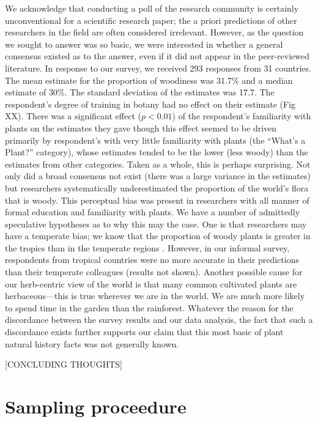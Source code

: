 \documentclass[12pt]{article}
\begin{document}
We acknowledge that conducting a poll of the research community is certainly unconventional for a scientific research paper; the a priori predictions of other researchers in the field are often considered irrelevant. However, as the question we sought to answer was so basic, we were interested in whether a general consensus existed as to the answer, even if it did not appear in the peer-reviewed literature. In response to our survey, we received 293 responses from 31 countries. The mean estimate for the proportion of woodiness was 31.7\% and a median estimate of 30\%. The standard deviation of the estimates was 17.7. The respondent's degree of training in botany had no effect on their estimate (Fig XX). There was a significant effect ($p<0.01$) of the respondent's  familiarity with plants on the estimates they gave though this effect seemed to be driven primarily by respondent's with very little familiarity with plants (the ``What's a Plant?'' category), whose estimates tended to be the lower (less woody) than the estimates from other categories. Taken as a whole, this is perhaps surprising. Not only did a broad consensus not exist (there was a large variance in the estimates) but researchers systematically underestimated the proportion of the world's flora that is woody. This perceptual bias was present in researchers with all manner of formal education and familiarity with plants. We have a number of admittedly speculative hypotheses as to why this may the case. One is that researchers may have a temperate bias; we know that the proportion of woody plants is greater in the tropics than in the temperate regions \citep{Molesheihgt}. However, in our informal survey, respondents from tropical countries were no more accurate in their predictions than their temperate colleagues (results not shown). Another possible cause for our herb-centric view of the world is that many common cultivated plants are herbaceous---this is true wherever we are in the world. We are much more likely to spend time in the garden than the rainforest. Whatever the reason for the discordance between the survey results and our data analysis, the fact that such a discordance exists further supports our claim that this most basic of plant natural history facts was not generally known.   

[CONCLUDING THOUGHTS]

\clearpage
\setcounter{secnumdepth}{1}
\appendix
\section{Sampling proceedure}
\end{document}
